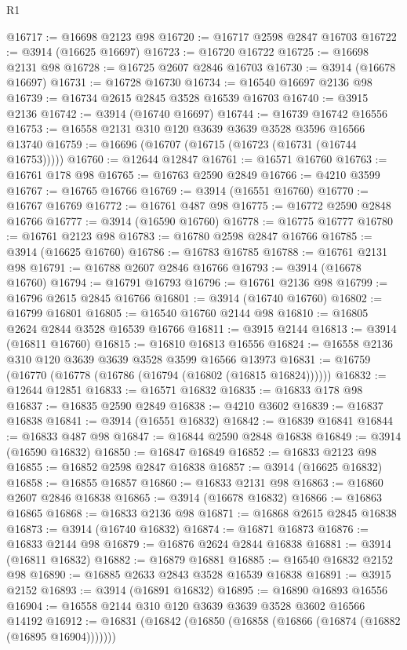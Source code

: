 \begin{lexlean}{R1}
\begin{coremodule}
@16717 := @16698 @2123 @98
@16720 := @16717 @2598 @2847 @16703
@16722 := @3914 (@16625 @16697)
@16723 := @16720 @16722
@16725 := @16698 @2131 @98
@16728 := @16725 @2607 @2846 @16703
@16730 := @3914 (@16678 @16697)
@16731 := @16728 @16730
@16734 := @16540 @16697 @2136 @98
@16739 := @16734 @2615 @2845 @3528 @16539 @16703
@16740 := @3915 @2136
@16742 := @3914 (@16740 @16697)
@16744 := @16739 @16742 @16556
@16753 := @16558 @2131 @310 @120 @3639 @3639 @3528 @3596 @16566 @13740
@16759 := @16696 (@16707 (@16715 (@16723 (@16731 (@16744 @16753)))))
@16760 := @12644 @12847
@16761 := @16571 @16760
@16763 := @16761 @178 @98
@16765 := @16763 @2590 @2849
@16766 := @4210 @3599
@16767 := @16765 @16766
@16769 := @3914 (@16551 @16760)
@16770 := @16767 @16769
@16772 := @16761 @487 @98
@16775 := @16772 @2590 @2848 @16766
@16777 := @3914 (@16590 @16760)
@16778 := @16775 @16777
@16780 := @16761 @2123 @98
@16783 := @16780 @2598 @2847 @16766
@16785 := @3914 (@16625 @16760)
@16786 := @16783 @16785
@16788 := @16761 @2131 @98
@16791 := @16788 @2607 @2846 @16766
@16793 := @3914 (@16678 @16760)
@16794 := @16791 @16793
@16796 := @16761 @2136 @98
@16799 := @16796 @2615 @2845 @16766
@16801 := @3914 (@16740 @16760)
@16802 := @16799 @16801
@16805 := @16540 @16760 @2144 @98
@16810 := @16805 @2624 @2844 @3528 @16539 @16766
@16811 := @3915 @2144
@16813 := @3914 (@16811 @16760)
@16815 := @16810 @16813 @16556
@16824 := @16558 @2136 @310 @120 @3639 @3639 @3528 @3599 @16566 @13973
@16831 := @16759 (@16770 (@16778 (@16786 (@16794 (@16802 (@16815 @16824))))))
@16832 := @12644 @12851
@16833 := @16571 @16832
@16835 := @16833 @178 @98
@16837 := @16835 @2590 @2849
@16838 := @4210 @3602
@16839 := @16837 @16838
@16841 := @3914 (@16551 @16832)
@16842 := @16839 @16841
@16844 := @16833 @487 @98
@16847 := @16844 @2590 @2848 @16838
@16849 := @3914 (@16590 @16832)
@16850 := @16847 @16849
@16852 := @16833 @2123 @98
@16855 := @16852 @2598 @2847 @16838
@16857 := @3914 (@16625 @16832)
@16858 := @16855 @16857
@16860 := @16833 @2131 @98
@16863 := @16860 @2607 @2846 @16838
@16865 := @3914 (@16678 @16832)
@16866 := @16863 @16865
@16868 := @16833 @2136 @98
@16871 := @16868 @2615 @2845 @16838
@16873 := @3914 (@16740 @16832)
@16874 := @16871 @16873
@16876 := @16833 @2144 @98
@16879 := @16876 @2624 @2844 @16838
@16881 := @3914 (@16811 @16832)
@16882 := @16879 @16881
@16885 := @16540 @16832 @2152 @98
@16890 := @16885 @2633 @2843 @3528 @16539 @16838
@16891 := @3915 @2152
@16893 := @3914 (@16891 @16832)
@16895 := @16890 @16893 @16556
@16904 := @16558 @2144 @310 @120 @3639 @3639 @3528 @3602 @16566 @14192
@16912 := @16831 (@16842 (@16850 (@16858 (@16866 (@16874 (@16882 (@16895 @16904)))))))

\end{coremodule}
\end{lexlean}
